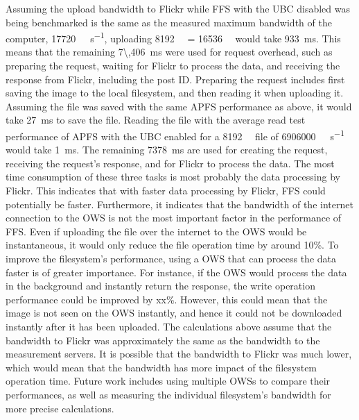 Assuming the upload bandwidth to Flickr while \gls{FFS} with the \gls{UBC} disabled was being benchmarked is the same as the measured maximum bandwidth of the computer, \ie \SI[per-mode = symbol]{17720}{\kilo\bit\per\second}, uploading \SI[per-mode = symbol]{8192}{\kilo\byte} = \SI[per-mode = symbol]{16536}{\kilo\bit} would take \SI[per-mode = symbol]{933}{\milli\second}. This means that the remaining \SI[per-mode = symbol]{7\,406}{\milli\second} were used for request overhead, such as preparing the request, waiting for Flickr to process the data, and receiving the response from Flickr, including the post ID. Preparing the request includes first saving the image to the local filesystem, and then reading it when uploading it. Assuming the file was saved with the same \gls{APFS} performance as above, it would take \SI[per-mode = symbol]{27}{\milli\second} to save the file. Reading the file with the average read test performance of \gls{APFS} with the \gls{UBC} enabled for a \SI[per-mode = symbol]{8192}{\kilo\byte} file of \SI[per-mode = symbol]{6906000}{\kilo\byte\per\second} would take \SI[per-mode = symbol]{1}{\milli\second}. The remaining \SI[per-mode = symbol]{7378}{\milli\second} are used for creating the request, receiving the request's response, and for Flickr to process the data. The most time consumption of these three tasks is most probably the data processing by Flickr. This indicates that with faster data processing by Flickr, \gls{FFS} could potentially be faster. Furthermore, it indicates that the bandwidth of the internet connection to the \gls{OWS} is not the most important factor in the performance of \gls{FFS}. Even if uploading the file over the internet to the \gls{OWS} would be instantaneous, it would only reduce the file operation time by around 10\%. To improve the filesystem's performance, using a \gls{OWS} that can process the data faster is of greater importance. For instance, if the \gls{OWS} would process the data in the background and instantly return the response, the write operation performance could be improved by xx\%. However, this could mean that the image is not seen on the \gls{OWS} instantly, and hence it could not be downloaded instantly after it has been uploaded.  %
The calculations above assume that the bandwidth to Flickr was approximately the same as the bandwidth to the measurement servers. It is possible that the bandwidth to Flickr was much lower, which would mean that the bandwidth has more impact of the filesystem operation time. Future work includes using multiple \glspl{OWS} to compare their performances, as well as measuring the individual filesystem's bandwidth for more precise calculations.


